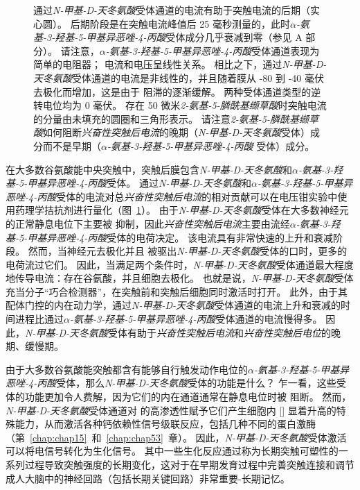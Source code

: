 \begin{figure}[htbp]
{	通过\textit{N-甲基-D-天冬氨酸}受体通道的电流有助于突触电流的后期（实心圆）。
	后期阶段是在突触电流峰值后 25 毫秒测量的，此时\textit{$\alpha$-氨基-3-羟基-5-甲基异恶唑-4-丙酸}受体成分几乎衰减到零（参见 A 部分）。
	请注意，\textit{$\alpha$-氨基-3-羟基-5-甲基异恶唑-4-丙酸}受体通道表现为简单的电阻器；
	电流和电压呈线性关系。
	相比之下，通过\textit{N-甲基-D-天冬氨酸}受体通道的电流是非线性的，并且随着膜从 -80 到 -40 毫伏去极化而增加，这是由于  阻滞的逐渐缓解。
	两种受体通道类型的逆转电位均为 0 毫伏。
	存在 50 微米\textit{2-氨基-5-膦酰基缬草酸}时突触电流的分量由未填充的圆圈和三角形表示。
	请注意\textit{2-氨基-5-膦酰基缬草酸}如何阻断\textit{兴奋性突触后电流}的晚期（\textit{N-甲基-D-天冬氨酸}受体）成分而不是早期（\textit{$\alpha$-氨基-3-羟基-5-甲基异恶唑-4-丙酸} 受体）成分。}
	\label{fig:13_9}
\end{figure}


在大多数谷氨酸能中央突触中，突触后膜包含\textit{N-甲基-D-天冬氨酸}和\textit{$\alpha$-氨基-3-羟基-5-甲基异恶唑-4-丙酸}受体。
通过\textit{N-甲基-D-天冬氨酸}和\textit{$\alpha$-氨基-3-羟基-5-甲基异恶唑-4-丙酸}受体的电流对总\textit{兴奋性突触后电流}的相对贡献可以在电压钳实验中使用药理学拮抗剂进行量化（图~\ref{fig:13_9}）。
由于\textit{N-甲基-D-天冬氨酸}受体在大多数神经元的正常静息电位下主要被  抑制，因此\textit{兴奋性突触后电流}主要由流经\textit{$\alpha$-氨基-3-羟基-5-甲基异恶唑-4-丙酸}受体的电荷决定。
该电流具有非常快速的上升和衰减阶段。
然而，当神经元去极化并且  被驱出\textit{N-甲基-D-天冬氨酸}受体的口时，更多的电荷流过它们。
因此，当满足两个条件时，\textit{N-甲基-D-天冬氨酸}受体通道最大程度地传导电流：存在谷氨酸，并且细胞去极化。
也就是说，\textit{N-甲基-D-天冬氨酸}受体充当分子“巧合检测器”，在突触前和突触后细胞同时激活时打开。
此外，由于其配体门控的内在动力学，通过\textit{N-甲基-D-天冬氨酸}受体通道的电流上升和衰减的时间进程比通过\textit{$\alpha$-氨基-3-羟基-5-甲基异恶唑-4-丙酸}受体通道的电流慢得多。
因此，\textit{N-甲基-D-天冬氨酸}受体有助于\textit{兴奋性突触后电流}和\textit{兴奋性突触后电位}的晚期、缓慢期。


由于大多数谷氨酸能突触都含有能够自行触发动作电位的\textit{$\alpha$-氨基-3-羟基-5-甲基异恶唑-4-丙酸}受体，那么\textit{N-甲基-D-天冬氨酸}受体的功能是什么？
乍一看，这些受体的功能更加令人费解，因为它们的内在通道通常在静息电位时被  阻断。
然而，\textit{N-甲基-D-天冬氨酸}受体通道对  的高渗透性赋予它们产生细胞内 [] 显着升高的特殊能力，从而激活各种钙依赖性信号级联反应，包括几种不同的蛋白激酶（第~\ref{chap:chap15}~和~\ref{chap:chap53}~章）。
因此，\textit{N-甲基-D-天冬氨酸}受体激活可以将电信号转化为生化信号。
其中一些生化反应通过称为长期突触可塑性的一系列过程导致突触强度的长期变化，这对于在早期发育过程中完善突触连接和调节成人大脑中的神经回路（包括长期关键回路）非常重要-长期记忆。



